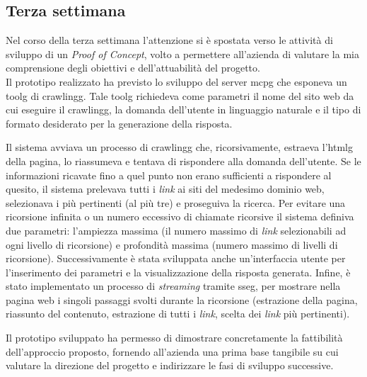 \subsection{Terza settimana}
Nel corso della terza settimana l'attenzione si è spostata verso le attività di sviluppo 
di un \textit{Proof of Concept}, volto a permettere all'azienda di valutare la mia comprensione degli obiettivi
e dell'attuabilità del progetto. 
\\Il prototipo realizzato ha previsto lo sviluppo 
del server \gls{mcpg} che esponeva un 
\gls{toolg} di \gls{crawlingg}.
Tale \gls{toolg} richiedeva come parametri il nome del sito web da cui 
eseguire il \gls{crawlingg}, la domanda dell'utente in linguaggio naturale 
e il tipo di formato desiderato per la generazione della risposta.

Il sistema avviava un processo di \gls{crawlingg} che, ricorsivamente, 
estraeva l'\gls{htmlg} della pagina, lo riassumeva e tentava di rispondere 
alla domanda dell'utente.
Se le informazioni ricavate fino a quel punto non erano sufficienti a 
rispondere al quesito, il sistema prelevava tutti i \textit{link} 
ai siti del medesimo 
dominio web, selezionava i più pertinenti (al 
più tre) e proseguiva la ricerca.
Per evitare una ricorsione infinita o un numero eccessivo di 
chiamate ricorsive il sistema definiva due parametri: l'ampiezza massima (il 
numero massimo di \textit{link} selezionabili ad ogni livello di 
ricorsione) e profondità massima (numero 
massimo di livelli di ricorsione).
Successivamente è stata sviluppata anche un'interfaccia utente 
per l'inserimento dei parametri e la visualizzazione della risposta generata.
Infine, è stato implementato un processo di \textit{streaming} tramite \gls{sseg}, 
per mostrare nella pagina web i singoli passaggi svolti durante la ricorsione 
(estrazione della pagina, riassunto del contenuto, estrazione di tutti i \textit{link}, 
scelta dei \textit{link} più pertinenti).

Il prototipo sviluppato ha permesso di dimostrare concretamente la fattibilità 
dell'approccio proposto, fornendo all'azienda una prima base tangibile su cui valutare 
la direzione del progetto e indirizzare le fasi di sviluppo successive.


